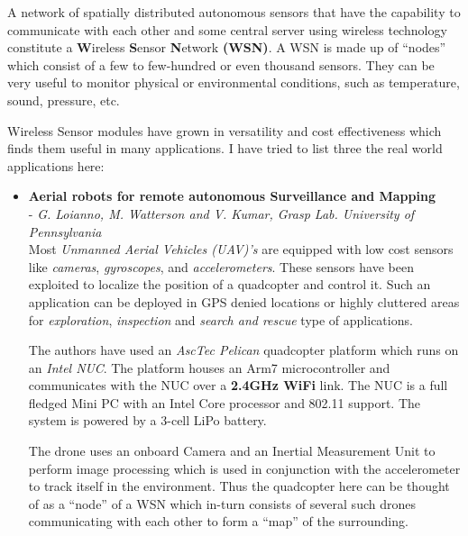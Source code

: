 \documentclass[fleqn, letterpaper, 11.5pt]{article}
\begin{document}
\pagetitle %
\bigskip

A network of spatially distributed autonomous sensors that have the capability to communicate with each other and some central server using wireless technology constitute a \textbf{W}ireless \textbf{S}ensor \textbf{N}etwork \textbf{(WSN)}. A WSN is made up of \enquote{nodes} which consist of a few to few-hundred or even thousand sensors. They can be very useful to monitor physical or environmental conditions, such as temperature, sound, pressure, etc.\par
Wireless Sensor modules have grown in versatility and cost effectiveness which finds them useful in many applications. I have tried to list three the real world applications here:

\begin{itemize}

\item \textbf{Aerial robots for remote autonomous Surveillance and Mapping}\\
- \textit{G. Loianno, M. Watterson and V. Kumar, Grasp Lab. University of Pennsylvania }\cite{Kumar}\\

Most \textit{Unmanned Aerial Vehicles (UAV)'s}  are equipped with low cost sensors like \textit{cameras}, \textit{gyroscopes}, and \textit{accelerometers}. These sensors have been exploited to localize the position of a quadcopter and control it. Such an application can be deployed in GPS denied locations or highly cluttered areas for \textit{exploration}, \textit{inspection} and \textit{search and rescue} type of applications.\par
The authors have used an \textit{AscTec Pelican}\cite{pelican} quadcopter platform which runs on an \textit{Intel NUC}\cite{Intel}. The platform houses an Arm7 microcontroller and communicates with the NUC over a \textbf{2.4GHz WiFi} link. The NUC is a full fledged Mini PC with an Intel Core processor and 802.11 support. The system is powered by a 3-cell LiPo battery.\par
The drone uses an onboard Camera and an Inertial Measurement Unit to perform image processing which is used in conjunction with the accelerometer to track itself in the environment. Thus the quadcopter here can be thought of as a \enquote{node} of a WSN which in-turn consists of several such drones communicating with each other to form a \enquote{map} of the surrounding.\par


\end{itemize}
\end{document}
